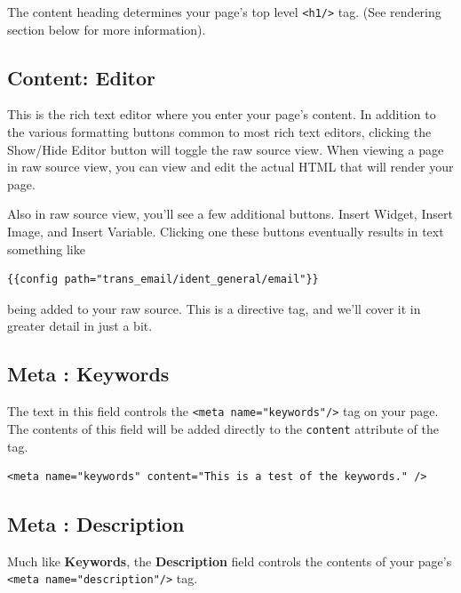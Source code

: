 \documentclass[oneside]{book}
\begin{document}
The content heading determines your page's top level \footnotesize\texttt{\textless h1/\textgreater } \normalsize  tag. (See rendering section below for more information).

\subsection{Content: Editor}

This is the rich text editor where you enter your page's content.  In addition to the various formatting buttons common to most rich text editors, clicking the Show/Hide Editor button will toggle the raw source view.  When viewing a page in raw source view, you can view and edit the actual HTML that will render your page.  

Also in raw source view, you'll see a few additional buttons. Insert Widget, Insert Image, and Insert Variable.  Clicking one these buttons eventually results in text something like

\begin{lstlisting}
{{config path="trans_email/ident_general/email"}}

\end{lstlisting}


being added to your raw source. This is a directive tag, and we'll cover it in greater detail in just a bit. 

\subsection{Meta : Keywords}

The text in this field controls the \footnotesize\texttt{\textless meta name="keywords"/\textgreater } \normalsize  tag on your page.  The contents of this field will be added directly to the \footnotesize\texttt{content} \normalsize  attribute of the tag. 

\begin{lstlisting}
<meta name="keywords" content="This is a test of the keywords." />

\end{lstlisting}


\subsection{Meta : Description}

Much like \textbf{Keywords}, the \textbf{Description} field controls the contents of your page's \footnotesize\texttt{\textless meta name="description"/\textgreater } \normalsize  tag.
\end{document}
